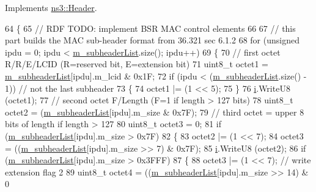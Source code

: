 Implements \hyperlink{classns3_1_1Header_afb61f1aac69ff8349a6bfe521fab5404}{ns3\+::\+Header}.


\begin{DoxyCode}
64 \{
65         \textcolor{comment}{// RDF TODO: implement BSR MAC control elements}
66 
67         \textcolor{comment}{// this part builds the MAC sub-header format from 36.321 sec 6.1.2}
68         \textcolor{keywordflow}{for} (\textcolor{keywordtype}{unsigned} ipdu = 0; ipdu < \hyperlink{classns3_1_1MmWaveMacPduHeader_a7eee94275aa3be87d89481dc90c1787c}{m\_subheaderList}.size(); ipdu++)
69         \{
70                 \textcolor{comment}{// first octet R/R/E/LCID (R=reserved bit, E=extension bit)}
71                 uint8\_t octet1 = \hyperlink{classns3_1_1MmWaveMacPduHeader_a7eee94275aa3be87d89481dc90c1787c}{m\_subheaderList}[ipdu].m\_lcid & 0x1F;
72                 \textcolor{keywordflow}{if} (ipdu < (\hyperlink{classns3_1_1MmWaveMacPduHeader_a7eee94275aa3be87d89481dc90c1787c}{m\_subheaderList}.size() - 1)) \textcolor{comment}{// not the last subheader}
73                 \{
74                         octet1 |= (1 << 5);
75                 \}
76                 \hyperlink{bernuolliDistribution_8m_a6f6ccfcf58b31cb6412107d9d5281426}{i}.WriteU8 (octet1);
77                 \textcolor{comment}{// second octet F/Length (F=1 if length > 127 bits)}
78                 uint8\_t octet2 = (\hyperlink{classns3_1_1MmWaveMacPduHeader_a7eee94275aa3be87d89481dc90c1787c}{m\_subheaderList}[ipdu].m\_size & 0x7F);
79                 \textcolor{comment}{// third octet = upper 8 bits of length if length > 127}
80                 uint8\_t octet3 = 0;
81                 \textcolor{keywordflow}{if} (\hyperlink{classns3_1_1MmWaveMacPduHeader_a7eee94275aa3be87d89481dc90c1787c}{m\_subheaderList}[ipdu].m\_size >  0x7F)
82                 \{
83                         octet2 |= (1 << 7);
84                         octet3 = ((\hyperlink{classns3_1_1MmWaveMacPduHeader_a7eee94275aa3be87d89481dc90c1787c}{m\_subheaderList}[ipdu].m\_size >> 7) & 0x7F);
85                         \hyperlink{bernuolliDistribution_8m_a6f6ccfcf58b31cb6412107d9d5281426}{i}.WriteU8 (octet2);
86                         \textcolor{keywordflow}{if} (\hyperlink{classns3_1_1MmWaveMacPduHeader_a7eee94275aa3be87d89481dc90c1787c}{m\_subheaderList}[ipdu].m\_size > 0x3FFF)
87                         \{
88                                 octet3 |= (1 << 7);             \textcolor{comment}{// write extension flag 2}
89                                 uint8\_t octet4 = ((\hyperlink{classns3_1_1MmWaveMacPduHeader_a7eee94275aa3be87d89481dc90c1787c}{m\_subheaderList}[ipdu].m\_size >> 14) & 0

\end{DoxyCode}
